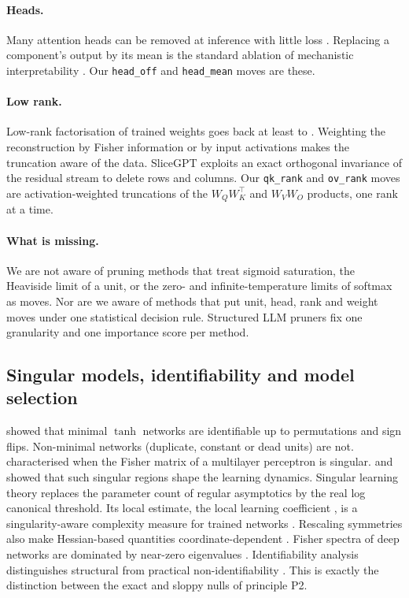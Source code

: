 \documentclass[11pt,a4paper]{article}
\theoremstyle{definition}
\newcommand{\code}[1]{\texttt{#1}}
\begin{document}
\paragraph{Heads.} Many attention heads can be removed at inference with little loss
\citep{michel2019sixteen,voita2019heads}. Replacing a component's output by its mean is
the standard ablation of mechanistic interpretability \citep{wang2023ioi}. Our
\code{head\_off} and \code{head\_mean} moves are these.

\paragraph{Low rank.} Low-rank factorisation of trained weights goes back at least to
\citet{denton2014linear}. Weighting the reconstruction by Fisher information
\citep{hsu2022fwsvd} or by input activations \citep{yuan2023asvd,wang2025svdllm}
makes the truncation aware of the data. SliceGPT \citep{ashkboos2024slicegpt} exploits
an exact orthogonal invariance of the residual stream to delete rows and columns.
Our \code{qk\_rank} and \code{ov\_rank} moves are activation-weighted truncations of
the $W_QW_K^\top$ and $W_VW_O$ products, one rank at a time.

\paragraph{What is missing.} We are not aware of pruning methods that treat sigmoid
saturation, the Heaviside limit of a unit, or the zero- and infinite-temperature limits
of softmax as moves. Nor are we aware of methods that put unit, head, rank and weight
moves under one statistical decision rule. Structured LLM pruners
\citep{ma2023llmpruner,an2024flap,ashkboos2024slicegpt} fix one granularity and one
importance score per method.

\subsection{Singular models, identifiability and model selection}
\label{sec:rel-singular}

\citet{sussmann1992uniqueness} showed that minimal $\tanh$ networks are identifiable
up to permutations and sign flips. Non-minimal networks (duplicate, constant or dead
units) are not. \citet{fukumizu1996regularity} characterised when the Fisher matrix of
a multilayer perceptron is singular. \citet{fukumizu2000local} and
\citet{amari2006singularities} showed that such singular regions shape the learning
dynamics. Singular learning theory \citep{watanabe2009algebraic,watanabe2013widely}
replaces the parameter count of regular asymptotics by the real log canonical
threshold. Its local estimate, the local learning coefficient \citep{lau2025llc}, is a
singularity-aware complexity measure for trained networks \citep{wei2023singular}.
Rescaling symmetries also make Hessian-based quantities coordinate-dependent
\citep{dinh2017sharp}. Fisher spectra of deep networks are dominated by near-zero
eigenvalues \citep{karakida2019universal}. Identifiability analysis distinguishes
structural from practical non-identifiability \citep{raue2009structural}. This is
exactly the distinction between the exact and sloppy nulls of principle P2.
\end{document}
